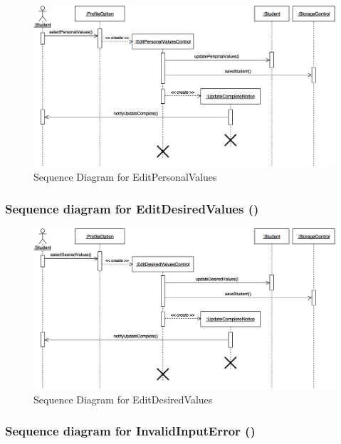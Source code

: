 \documentclass[12pt,letterpaper]{article}
\begin{document}
\begin{figure}[H]
	\centering{}
	\includegraphics[scale=0.3]{imgs/seq/edit-personal-values.png}
	\caption{Sequence Diagram for EditPersonalValues}
\end{figure}

\subsubsection*{Sequence diagram for EditDesiredValues (\editdesiredvalues{})}

\begin{figure}[H]
	\centering{}
	\includegraphics[scale=0.3]{imgs/seq/edit-desired-values.png}
	\caption{Sequence Diagram for EditDesiredValues}
\end{figure}

\subsubsection*{Sequence diagram for InvalidInputError (\invalidinputerror{})}
\end{document}
